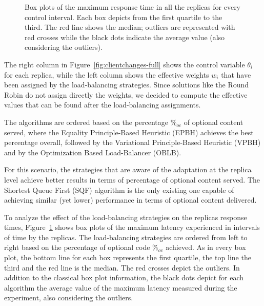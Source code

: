 \begin{figure}
\centering 
  \vspace{-4mm}
\caption{Box plots of the maximum response time in all the replicas
  for every control interval. Each box depicts from the first quartile
  to the third. The red line shows the median; outliers are
  represented with red crosses while the black dots indicate the
  average value (also considering the outliers).}
  \vspace{-2mm}
\label{fig:clientchanges-boxplot}
\end{figure}

The right column in Figure~\ref{fig:clientchanges-full} shows the
control variable $\theta_i$ for each replica, while the left column
shows the effective weights $w_i$ that have been assigned by the
load-balancing strategies. Since solutions like the Round Robin do not
assign directly the weights, we decided to compute the effective
values that can be found after the load-balancing assignments. 

The algorithms are ordered based on the percentage $\%_{oc}$ of optional
content served, where the Equality Principle-Based Heuristic (EPBH)
achieves the best percentage overall, followed by the Variational
Principle-Based Heuristic (VPBH) and by the Optimization Based
Load-Balancer (OBLB).

For this scenario, the strategies that are aware of the adaptation at
the replica level achieve better results in terms of percentage of
optional content served. The Shortest Queue First (SQF) algorithm is
the only existing one capable of achieving similar (yet lower)
performance in terms of optional content delivered.

To analyze the effect of the load-balancing strategies on the replicas
response times, Figure~\ref{fig:clientchanges-boxplot} shows box plots
of the maximum latency experienced in intervals of time by the
replicas. The load-balancing strategies are ordered from left to right
based on the percentage of optional code $\%_{oc}$ achieved. As in
every box plot, the bottom line for each box represents the first
quartile, the top line the third and the red line is the median. The
red crosses depict the outliers. In addition to the classical box plot
information, the black dots depict for each algorithm the average
value of the maximum latency measured during the experiment, also
considering the outliers.

